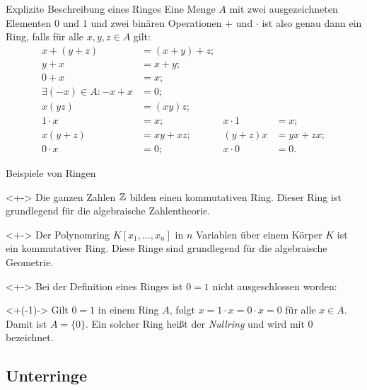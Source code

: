 \begin{frame}{Explizite Beschreibung eines Ringes}
    Eine Menge \(A\) mit zwei ausgezeichneten Elementen \(0\) und \(1\) und
    zwei binären Operationen \(+\) und \(\cdot\) ist also genau dann ein Ring,
    falls für alle \(x, y, z \in A\) gilt:
    \begin{align*}
        x + (y + z) & = (x + y) + z ; \\
        y + x & = x + y; \\
        0 + x & = x; \\
        \exists (-x) \in A\colon -x + x & = 0; \\
        x (y z) & = (x y) z; \\
        1 \cdot x & = x; & x \cdot 1 & = x; \\
        x (y + z) & = x y + x z; & (y + z) x & = y x + z x; \\
        0 \cdot x & = 0; & x \cdot 0 & = 0.
    \end{align*}
\end{frame}

\begin{frame}{Beispiele von Ringen}   
    \begin{example}<+->
        Die ganzen Zahlen \(\mathbb Z\) bilden einen kommutativen Ring. Dieser Ring
        ist grundlegend für die algebraische Zahlentheorie.
    \end{example}
    \begin{example}<+->
        Der Polynomring \(K[x_1, \dotsc, x_n]\) in \(n\) Variablen über einem
        Körper \(K\) ist ein kommutativer Ring. Diese Ringe sind grundlegend für
        die algebraische Geometrie.
    \end{example}
    \begin{visibleenv}<+->
        Bei der Definition eines Ringes ist \(0 = 1\) nicht ausgeschlossen worden:
        \begin{example}<+(-1)->
            Gilt \(0 = 1\) in einem Ring \(A\), folgt \(x = 1 \cdot x
            = 0 \cdot x = 0\) für alle \(x \in A\).
            Damit ist \(A = \{0\}\). Ein solcher Ring heißt der
            \emph{Nullring} und wird mit \(0\) bezeichnet.
        \end{example}
    \end{visibleenv}
\end{frame}

\subsection{Unterringe}

